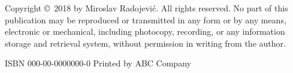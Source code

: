 Copyright \copyright\ 2018 by Miroslav Radojevi\'{c}. All rights reserved. No part of this publication may be reproduced or transmitted in any form or by any means, electronic or mechanical, including photocopy, recording, or any information storage and retrieval system, without permission in writing from the author.

\bigskip
ISBN 000-00-0000000-0
\bigskip
Printed by ABC Company
\setlength{\parindent}{\myindent}

